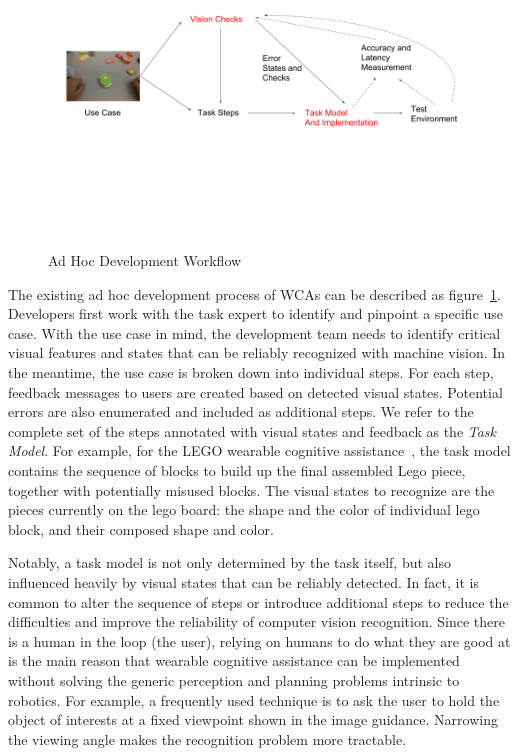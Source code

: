 \begin{figure}
  \centering
  \includegraphics[trim={0 6cm 0 0},width=\linewidth]{FIGS/ad-hoc-workflow}
  \caption{Ad Hoc Development Workflow}
  \label{figs:workflow}
\end{figure}

The existing ad hoc development process of WCAs can be described as
figure~\ref{figs:workflow}. Developers first work with the task expert to
identify and pinpoint a specific use case. With the use case in mind, the
development team needs to identify critical visual features and states that can
be reliably recognized with machine vision. In the meantime, the use case is
broken down into individual steps. For each step, feedback messages to users are
created based on detected visual states. Potential errors are also enumerated
and included as additional steps. We refer to the complete set of the steps
annotated with visual states and feedback as the \textit{Task Model}. For
example, for the LEGO wearable cognitive assistance~\cite{chen2017empirical},
the task model contains the sequence of blocks to build up the final assembled
Lego piece, together with potentially misused blocks. The visual states to
recognize are the pieces currently on the lego board: the shape and the color of
individual lego block, and their composed shape and color.

Notably, a task model is not only determined by the task itself, but also
influenced heavily by visual states that can be reliably detected. In fact, it
is common to alter the sequence of steps or introduce additional steps to reduce
the difficulties and improve the reliability of computer vision recognition.
Since there is a human in the loop (the user), relying on humans to do what they
are good at is the main reason that wearable cognitive assistance can be
implemented without solving the generic perception and planning problems
intrinsic to robotics. For example, a frequently used technique is to ask the
user to hold the object of interests at a fixed viewpoint shown in the image
guidance. Narrowing the viewing angle makes the recognition problem more
tractable.

